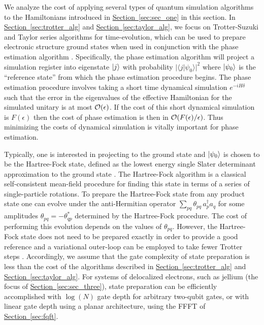 \documentclass[superscriptaddress,aps,pra,nofootinbib,notitlepage,10pt,longbibliography]{revtex4-1}
\renewcommand{\sec}[1]{\hyperref[sec:#1]{Section~\ref*{sec:#1}}}
\def\ket#1{\mathinner{|{#1}\rangle}}
\newcommand{\braket}[2]{\langle #1|#2\rangle}
\begin{document}
We analyze the cost of applying several types of quantum simulation algorithms to the Hamiltonians introduced in \sec{sec_one} in this section. In \sec{trotter_alg} and \sec{taylor_alg}, we focus on Trotter-Suzuki and Taylor series algorithms for time-evolution, which can be used to prepare electronic structure ground states when used in conjunction with the phase estimation algorithm \cite{Aspuru-Guzik2005,Kitaev1995}. Specifically, the phase estimation algorithm will project a simulation register into eigenstate $\ket{j}$ with probability $|\braket{j}{\psi_0} |^2$ where $\ket{\psi_0}$ is the ``reference state'' from which the phase estimation procedure begins. The phase estimation procedure involves taking a short time dynamical simulation $e^{-iH\delta}$ such that the error in the eigenvalues of the effective Hamiltonian for the simulated unitary is at most ${\cal O}(\epsilon)$.  If the cost of this short dynamical simulation is $F(\epsilon)$ then the cost of phase estimation is then in ${\cal O}(F(\epsilon)/\epsilon)$. Thus minimizing the costs of dynamical simulation is vitally important for phase estimation. 

Typically, one is interested in projecting to the ground state and $\ket{\psi_0}$ is chosen to be the Hartree-Fock state, defined as the lowest energy single Slater determinant approximation to the ground state \cite{Helgaker2002}. The Hartree-Fock algorithm is a classical self-consistent mean-field procedure for finding this state in terms of a series of single-particle rotations. To prepare the Hartree-Fock state from any product state one can evolve under the anti-Hermitian operator $\sum_{pq} \theta_{pq} \, a^\dagger_p a_q$ for some amplitudes $\theta_{pq} = -\theta_{qp}^*$ determined by the Hartree-Fock procedure. The cost of performing this evolution depends on the values of $\theta_{pq}$. However, the Hartree-Fock state does not need to be prepared exactly in order to provide a good reference and a variational outer-loop can be employed to take fewer Trotter steps \cite{Wecker2014}. Accordingly, we assume that the gate complexity of state preparation is less than the cost of the algorithms described in \sec{trotter_alg} and \sec{taylor_alg}. For systems of delocalized electrons, such as jellium (the focus of \sec{sec_three}), state preparation can be efficiently 
accomplished with $\log(N)$ gate depth for arbitrary two-qubit gates, or with linear gate depth using a planar architecture, using the FFFT of \sec{fqft}.
\end{document}
